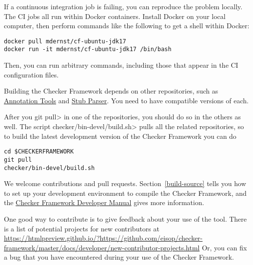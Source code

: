 If a continuous integration job is failing, you can reproduce the problem locally.
The CI jobs all run within Docker containers.
Install Docker on your local computer, then perform commands like the
following to get a shell within Docker:

\begin{Verbatim}
docker pull mdernst/cf-ubuntu-jdk17
docker run -it mdernst/cf-ubuntu-jdk17 /bin/bash
\end{Verbatim}

Then, you can run arbitrary commands, including those that appear in the
CI configuration files.



Building the Checker Framework depends on other repositories, such as
\href{https://github.com/eisop/annotation-tools/}{Annotation Tools} and
\href{https://github.com/eisop/stubparser/}{Stub Parser}.
You need to have compatible versions of each.

After you \<git pull> in one of the repositories, you should do so in the
others as well.  The script \<checker/bin-devel/build.sh> pulls all the
related repositories, so to build the latest development version of the
Checker Framework you can do

\begin{Verbatim}
cd $CHECKERFRAMEWORK
git pull
checker/bin-devel/build.sh
\end{Verbatim}



We welcome contributions and pull requests.  Section~\ref{build-source}
tells you how to set up your development environment to compile the Checker
Framework, and the
\href{https://htmlpreview.github.io/?https://github.com/eisop/checker-framework/master/docs/developer/developer-manual.html}{Checker
  Framework Developer Manual} gives more information.

One good way to contribute is to give feedback about your use of the tool.
There is a list
of potential projects for new contributors at
\url{https://htmlpreview.github.io/?https://github.com/eisop/checker-framework/master/docs/developer/new-contributor-projects.html}
Or, you can fix a bug that
you have encountered during your use of the Checker Framework.



